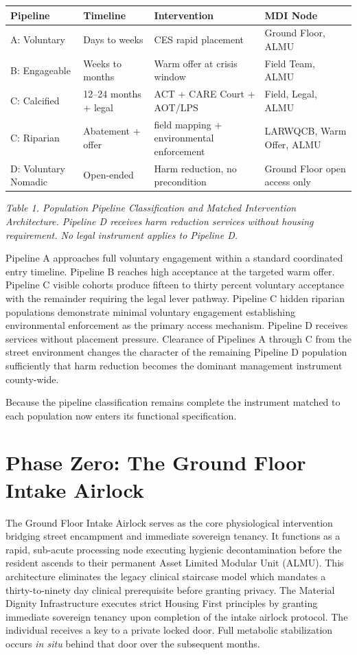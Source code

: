 \documentclass[12pt, letterpaper]{article}
\begin{document}
{\singlespacing
\begin{tabularx}{\textwidth}{@{}lXXX@{}}
\toprule
\rowcolor{rowgray}
Pipeline & Timeline & Intervention & MDI Node \\
\midrule
A: Voluntary & Days to weeks & CES rapid placement & Ground Floor, ALMU \\
\rowcolor{rowgray}
B: Engageable & Weeks to months & Warm offer at crisis window & Field Team, ALMU \\
C: Calcified & 12--24 months + legal & ACT + CARE Court + AOT/LPS & Field, Legal, ALMU \\
\rowcolor{rowgray}
C: Riparian & Abatement + offer & field mapping + environmental enforcement & LARWQCB, Warm Offer, ALMU \\
D: Voluntary Nomadic & Open-ended & Harm reduction, no precondition & Ground Floor open access only \\
\bottomrule
\end{tabularx}\par
\vspace{8pt}
\noindent\textit{Table 1. Population Pipeline Classification and Matched Intervention Architecture. Pipeline D receives harm reduction services without housing requirement. No legal instrument applies to Pipeline D.}
\par}
Pipeline A approaches full voluntary engagement within a standard coordinated entry timeline. Pipeline B reaches high acceptance at the targeted warm offer. Pipeline C visible cohorts produce fifteen to thirty percent voluntary acceptance with the remainder requiring the legal lever pathway. Pipeline C hidden riparian populations demonstrate minimal voluntary engagement establishing environmental enforcement as the primary access mechanism. Pipeline D receives services without placement pressure. Clearance of Pipelines A through C from the street environment changes the character of the remaining Pipeline D population sufficiently that harm reduction becomes the dominant management instrument county-wide.

Because the pipeline classification remains complete the instrument matched to each population now enters its functional specification.

\clearpage
\section{Phase Zero: The Ground Floor Intake Airlock}

The Ground Floor Intake Airlock serves as the core physiological intervention bridging street encampment and immediate sovereign tenancy. It functions as a rapid, sub-acute processing node executing hygienic decontamination before the resident ascends to their permanent Asset Limited Modular Unit (ALMU). This architecture eliminates the legacy clinical staircase model which mandates a thirty-to-ninety day clinical prerequisite before granting privacy. The Material Dignity Infrastructure executes strict Housing First principles by granting immediate sovereign tenancy upon completion of the intake airlock protocol. The individual receives a key to a private locked door. Full metabolic stabilization occurs \textit{in situ} behind that door over the subsequent months.
\end{document}
